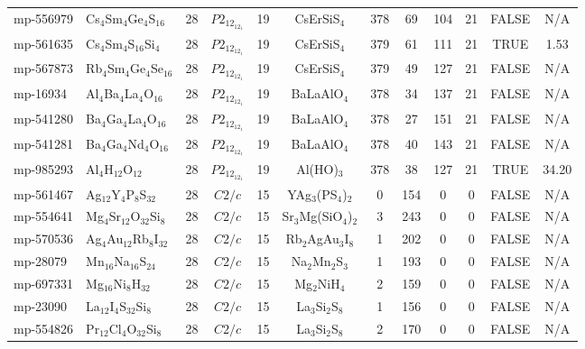 {\begin{longtable}{llcccccccccc}
    mp-556979 & Cs$_{4}$Sm$_{4}$Ge$_{4}$S$_{16}$ & 28    & $P2_12_12_1$ & 19    & CsErSiS$_{4}$ & 378   & 69    & 104   & 21    & FALSE & N/A \\
    mp-561635 & Cs$_{4}$Sm$_{4}$S$_{16}$Si$_{4}$ & 28    & $P2_12_12_1$ & 19    & CsErSiS$_{4}$ & 379   & 61    & 111   & 21    & TRUE  & 1.53  \\
    mp-567873 & Rb$_{4}$Sm$_{4}$Ge$_{4}$Se$_{16}$ & 28    & $P2_12_12_1$ & 19    & CsErSiS$_{4}$ & 379   & 49    & 127   & 21    & FALSE & N/A \\
    mp-16934 & Al$_{4}$Ba$_{4}$La$_{4}$O$_{16}$ & 28    & $P2_12_12_1$ & 19    & BaLaAlO$_{4}$ & 378   & 34    & 137   & 21    & FALSE & N/A \\
    mp-541280 & Ba$_{4}$Ga$_{4}$La$_{4}$O$_{16}$ & 28    & $P2_12_12_1$ & 19    & BaLaAlO$_{4}$ & 378   & 27    & 151   & 21    & FALSE & N/A \\
    mp-541281 & Ba$_{4}$Ga$_{4}$Nd$_{4}$O$_{16}$ & 28    & $P2_12_12_1$ & 19    & BaLaAlO$_{4}$ & 378   & 40    & 143   & 21    & FALSE & N/A \\
    mp-985293 & Al$_{4}$H$_{12}$O$_{12}$ & 28    & $P2_12_12_1$ & 19    & Al(HO)$_{3}$ & 378   & 38    & 127   & 21    & TRUE  & 34.20  \\
    mp-561467 & Ag$_{12}$Y$_{4}$P$_{8}$S$_{32}$ & 28    & $C2/c$ & 15    & YAg$_{3}$(PS$_{4}$)$_{2}$ & 0     & 154   & 0     & 0     & FALSE & N/A \\
    mp-554641 & Mg$_{4}$Sr$_{12}$O$_{32}$Si$_{8}$ & 28    & $C2/c$ & 15    & Sr$_{3}$Mg(SiO$_{4}$)$_{2}$ & 3     & 243   & 0     & 0     & FALSE & N/A \\
    mp-570536 & Ag$_{4}$Au$_{12}$Rb$_{8}$I$_{32}$ & 28    & $C2/c$ & 15    & Rb$_{2}$AgAu$_{3}$I$_{8}$ & 1     & 202   & 0     & 0     & FALSE & N/A \\
    mp-28079 & Mn$_{16}$Na$_{16}$S$_{24}$ & 28    & $C2/c$ & 15    & Na$_{2}$Mn$_{2}$S$_{3}$ & 1     & 193   & 0     & 0     & FALSE & N/A \\
    mp-697331 & Mg$_{16}$Ni$_{8}$H$_{32}$ & 28    & $C2/c$ & 15    & Mg$_{2}$NiH$_{4}$ & 2     & 159   & 0     & 0     & FALSE & N/A \\
    mp-23090 & La$_{12}$I$_{4}$S$_{32}$Si$_{8}$ & 28    & $C2/c$ & 15    & La$_{3}$Si$_{2}$S$_{8}$ & 1     & 156   & 0     & 0     & FALSE & N/A \\
    mp-554826 & Pr$_{12}$Cl$_{4}$O$_{32}$Si$_{8}$ & 28    & $C2/c$ & 15    & La$_{3}$Si$_{2}$S$_{8}$ & 2     & 170   & 0     & 0     & FALSE & N/A \\

\end{longtable}}
